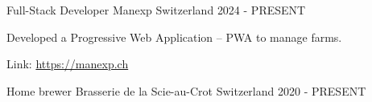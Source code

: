 

\begin{cventries}

    \cventry
    {Full-Stack Developer} %
    {Manexp} %
    {Switzerland} %
    {2024 - PRESENT} %
    {
      \begin{cvitems} %
        \item {Developed a Progressive Web Application -- PWA to manage farms.}
        \item {Link: \href{https://manexp.ch}{https://manexp.ch}}
      \end{cvitems}
    }

    \cventry
    {Home brewer} %
    {Brasserie de la Scie-au-Crot} %
    {Switzerland} %
    {2020 - PRESENT} %
    {}

\end{cventries}
